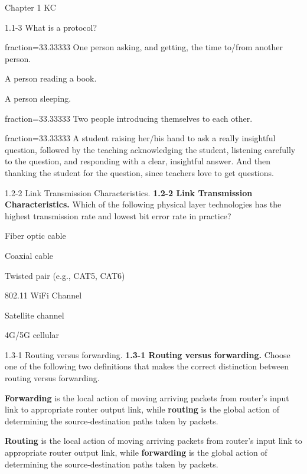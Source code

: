 \documentclass[a4paper]{article}
\begin{document}
\begin{quiz}{Chapter 1 KC}
\begin{multi}[points=1,multiple]{1.1-3 What is a protocol?}
\item[fraction=33.33333] One person asking, and getting, the time to/from another person.
\item A person reading a book.
\item A person sleeping.
\item[fraction=33.33333] Two people introducing themselves to each other.
\item[fraction=33.33333] A student raising her/his hand to ask a really insightful question, followed by the teaching acknowledging the student, listening carefully to the question, and responding with a clear, insightful answer.  And then thanking the student for the question, since teachers love to get questions.
\end{multi}

\begin{multi}[points=1]{1.2-2 Link Transmission Characteristics.}
\textbf{1.2-2 Link Transmission Characteristics.}
Which of the following physical layer technologies has the highest transmission rate and lowest bit error rate in practice?
\item* Fiber optic cable
\item Coaxial cable
\item Twisted pair (e.g., CAT5, CAT6)
\item 802.11 WiFi Channel
\item Satellite channel
\item 4G/5G cellular
\end{multi}

\begin{multi}[points=1]{1.3-1 Routing versus forwarding.}
\textbf{1.3-1 Routing versus forwarding.} 
Choose one of the following two definitions that makes the correct distinction between routing versus forwarding.
\item* \textbf{Forwarding} is the local action of moving arriving packets from router's input link to appropriate router output link, while \textbf{routing} is the global action of determining the source-destination paths taken by packets.
\item \textbf{Routing} is the local action of moving arriving packets from router's input link to appropriate router output link, while \textbf{forwarding} is the global action of determining the source-destination paths taken by packets.
\end{multi}


\end{quiz}
\end{document}
